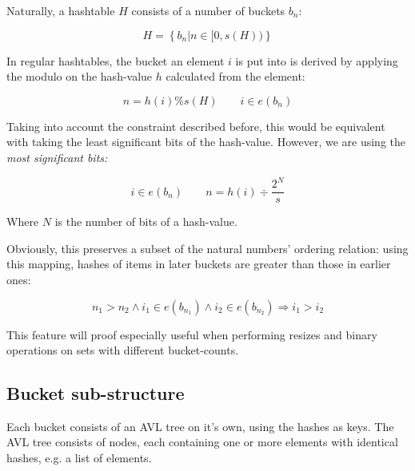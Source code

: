         Naturally, a hashtable $H$ consists of a number of buckets $b_n$:

        \begin{equation}
            H = \left\{ b_n | n \in [0, s(H)) \right\}
        \end{equation}

        In regular hashtables, the bucket an element $i$ is put into is derived
        by applying the modulo on the hash-value $h$ calculated from the
        element:

        \begin{equation}
            n = h(i) \% s(H) \qquad i \in e(b_n)
        \end{equation}

        Taking into account the constraint described before, this would be
        equivalent with taking the least significant bits of the hash-value.
        However, we are using the \em most\em{} significant bits:

        \begin{equation}
            i \in e(b_n) \qquad n = h(i) \div \frac{2^N}{s}
        \end{equation}

        Where $N$ is the number of bits of a hash-value.
        
        Obviously, this preserves a subset of the natural numbers' ordering
        relation: using this mapping, hashes of items in later buckets are
        greater than those in earlier ones:

        \begin{equation}
            n_1 > n_2 \land i_1 \in e(b_{n_1}) \land i_2 \in e(b_{n_2})
            \Rightarrow i_1 > i_2
        \end{equation}

        This feature will proof especially useful when performing resizes and
        binary operations on sets with different bucket-counts.

    \subsection{Bucket sub-structure}
    \label{sec:data_layout-bucketstruct}

        Each bucket consists of an AVL tree on it's own, using the hashes as
        keys.
        The AVL tree consists of nodes, each containing one or more elements
        with identical hashes, e.g. a list of elements.


